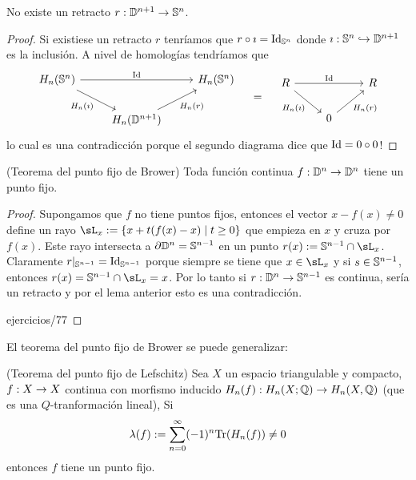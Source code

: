 \documentclass[../../topologia_algebraica]{subfiles}
\begin{document}
\begin{lema}
  No existe un retracto $r:\mathbb{D}^{n+1}\rightarrow\mathbb{S}^n$.
\end{lema}
\begin{proof}
  Si existiese un retracto $r$ tenr\'iamos que $r\circ\imath=\text{Id}_{\mathbb{S}^n}$ donde
  $\imath:\mathbb{S}^n\hookrightarrow\mathbb{D}^{n+1}$ es la inclusi\'on. A nivel de homolog\'ias
  tendr\'iamos que
  \[
    \begin{tikzcd}
      H_n(\Sn^n) \arrow[rr,"\Id"] \arrow[dr,"H_n(\imath)"'] && H_n(\Sn^n)\\
      & H_n(\DD^{n+1}) \arrow[ur,"H_n(r)"']&
    \end{tikzcd}\quad=\quad
    \begin{tikzcd}
      R \arrow[rr,"\Id"] \arrow[dr,"H_n(\imath)"'] && R\\
      & 0 \arrow[ur,"H_n(r)"']&
    \end{tikzcd}
  \]
  lo cual es una contradicci\'on porque el segundo diagrama dice que $\text{Id}=0\circ 0$!
\end{proof}

\begin{thm}(Teorema del punto fijo de Brower)
  Toda funci\'on continua $f:\mathbb{D}^n\rightarrow\mathbb{D}^n$ tiene un punto fijo.
\end{thm}
\begin{proof}
  Supongamos que $f$ no tiene puntos fijos, entonces el vector $x-f(x)\neq0$ define
  un rayo $\sL_x:=\{x+t(f(x)-x)\mid t\geq 0\}$ que empieza en $x$ y cruza por $f(x)$.
  Este rayo intersecta a $\partial\mathbb{D}^n=\mathbb{S}^{n-1}$ en un punto $r(x):=\Sn^{n-1}\cap\sL_x$.
  Claramente $r|_{\mathbb{S}^{n-1}}=\text{Id}_{\mathbb{S}^{n-1}}$ porque siempre se tiene que $x\in\sL_x$ y si
  $s\in\mathbb{S}^{n-1}$, entonces $r(x)=\Sn^{n-1}\cap\sL_x=x$.
  Por lo tanto si $r:\mathbb{D}^n\rightarrow\mathbb{S}^{n-1}$ es continua, ser\'ia un retracto y por el lema anterior
  esto es una contradicci\'on.

{ejercicios/77}%
\end{proof}


El teorema del punto fijo de Brower se puede generalizar:

\begin{thm}(Teorema del punto fijo de Lefschitz)
  Sea $X$ un espacio triangulable y compacto, $f:X\rightarrow X$ continua con morfismo inducido
  $H_n(f):H_n(X;\mathbb{Q})\rightarrow H_n(X,\mathbb{Q})$ (que es una $Q$-tranformaci\'on lineal), Si
  \[
    \lambda(f):=\sum_{n=0}^{\infty}(-1)^n\text{Tr}(H_n(f))\neq 0
  \]
  entonces $f$ tiene un punto fijo.
\end{thm}
\end{document}
